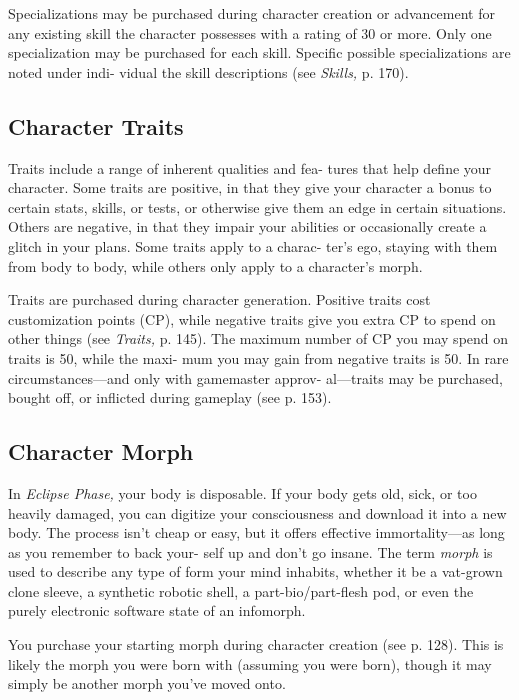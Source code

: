 Specializations may be purchased during character 
creation or advancement for any existing skill the 
character possesses with a rating of 30 or more. Only 
one specialization may be purchased for each skill. 
Specific possible specializations are noted under indi-
vidual the skill descriptions (see \textit{Skills,} p. 170).

\subsection{Character Traits}

Traits include a range of inherent qualities and fea-
tures that help define your character. Some traits are 
positive, in that they give your character a bonus to 
certain stats, skills, or tests, or otherwise give them 
an edge in certain situations. Others are negative, in 
that they impair your abilities or occasionally create 
a glitch in your plans. Some traits apply to a charac-
ter's ego, staying with them from body to body, while 
others only apply to a character's morph. 

Traits are purchased during character generation. 
Positive traits cost customization points (CP), while 
negative traits give you extra CP to spend on other 
things (see \textit{Traits,} p. 145). The maximum number of 
CP you may spend on traits is 50, while the maxi-
mum you may gain from negative traits is 50. In rare 
circumstances—and only with gamemaster approv-
al—traits may be purchased, bought off, or inflicted 
during gameplay (see p. 153).

\subsection{Character Morph}

In \textit{Eclipse Phase,} your body is disposable. If your body 
gets old, sick, or too heavily damaged, you can digitize 
your consciousness and download it into a new body. 
The process isn't cheap or easy, but it offers effective 
immortality—as long as you remember to back your-
self up and don't go insane. The term \textit{morph }is used to 
describe any type of form your mind inhabits, whether 
it be a vat-grown clone sleeve, a synthetic robotic shell, 
a part-bio/part-flesh pod, or even the purely electronic 
software state of an infomorph.

You purchase your starting morph during character 
creation (see p. 128). This is likely the morph you 
were born with (assuming you were born), though it 
may simply be another morph you've moved onto.

